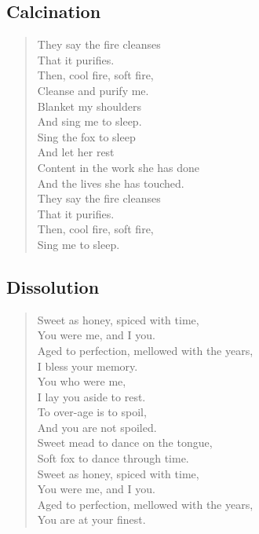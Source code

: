 \subsection{Calcination}

\begin{verse}
They say the fire cleanses\\
\vin That it purifies.\\
Then, cool fire, soft fire,\\
\vin Cleanse and purify me.\\
Blanket my shoulders\\
\vin And sing me to sleep.\\
Sing the fox to sleep\\
\vin And let her rest\\
Content in the work she has done\\
\vin And the lives she has touched.\\
They say the fire cleanses\\
\vin That it purifies.\\
Then, cool fire, soft fire,\\
\vin Sing me to sleep.\\
\end{verse}
\newpage

\subsection{Dissolution}

\begin{verse}
Sweet as honey, spiced with time,\\
\vin You were me, and I you.\\
Aged to perfection, mellowed with the years,\\
\vin I bless your memory.\\
You who were me,\\
\vin I lay you aside to rest.\\
To over-age is to spoil,\\
\vin And you are not spoiled.\\
Sweet mead to dance on the tongue,\\
\vin Soft fox to dance through time.\\
Sweet as honey, spiced with time,\\
\vin You were me, and I you.\\
Aged to perfection, mellowed with the years,\\
\vin You are at your finest.\\
\end{verse}
\newpage

